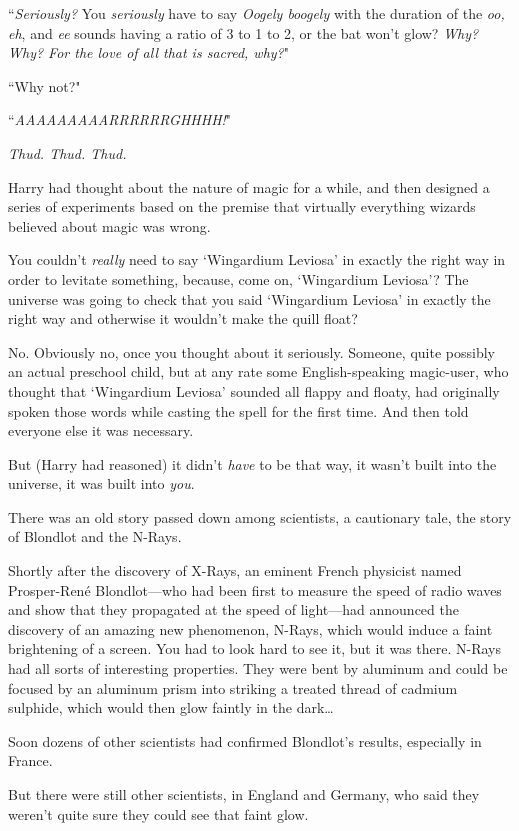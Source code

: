 ``\emph{Seriously?} You \emph{seriously} have to say \emph{Oogely boogely} with the duration of the \emph{oo, eh}, and \emph{ee} sounds having a ratio of 3 to 1 to 2, or the bat won't glow? \emph{Why? Why? For the love of all that is sacred, why?}"

``Why not?"

``\emph{AAAAAAAAARRRRRRGHHHH!}"

\emph{Thud. Thud. Thud.}

Harry had thought about the nature of magic for a while, and then designed a series of experiments based on the premise that virtually everything wizards believed about magic was wrong.

You couldn't \emph{really} need to say `Wingardium Leviosa' in exactly the right way in order to levitate something, because, come on, `Wingardium Leviosa'? The universe was going to check that you said `Wingardium Leviosa' in exactly the right way and otherwise it wouldn't make the quill float?

No. Obviously no, once you thought about it seriously. Someone, quite possibly an actual preschool child, but at any rate some English-speaking magic-user, who thought that `Wingardium Leviosa' sounded all flappy and floaty, had originally spoken those words while casting the spell for the first time. And then told everyone else it was necessary.

But (Harry had reasoned) it didn't \emph{have} to be that way, it wasn't built into the universe, it was built into \emph{you}.

There was an old story passed down among scientists, a cautionary tale, the story of Blondlot and the N-Rays.

Shortly after the discovery of X-Rays, an eminent French physicist named Prosper-René Blondlot—who had been first to measure the speed of radio waves and show that they propagated at the speed of light—had announced the discovery of an amazing new phenomenon, N-Rays, which would induce a faint brightening of a screen. You had to look hard to see it, but it was there. N-Rays had all sorts of interesting properties. They were bent by aluminum and could be focused by an aluminum prism into striking a treated thread of cadmium sulphide, which would then glow faintly in the dark{\ldots}

Soon dozens of other scientists had confirmed Blondlot's results, especially in France.

But there were still other scientists, in England and Germany, who said they weren't quite sure they could see that faint glow.

